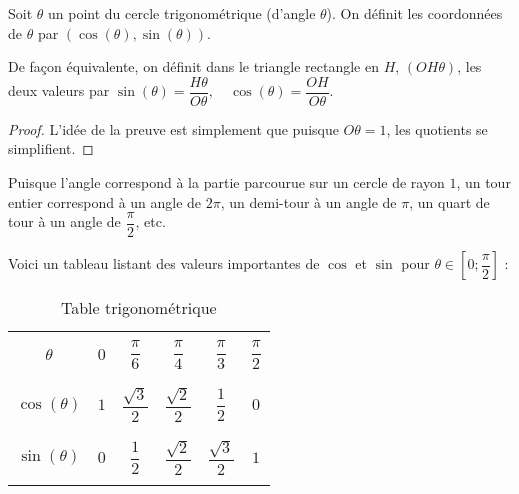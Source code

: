 
\begin{defi}
    Soit $\theta$ un point du cercle trigonométrique (d'angle $\theta$). On définit les coordonnées de $\theta$ par $(\cos(\theta),\sin(\theta))$.
    
    De façon équivalente, on définit dans le triangle rectangle en $H$, $(OH\theta)$, les deux valeurs par $\sin(\theta)=\dfrac{H\theta}{O\theta}, \quad \cos(\theta)=\dfrac{OH}{O\theta}$.
\end{defi}
\begin{proof}
    L'idée de la preuve est simplement que puisque $O\theta=1$, les quotients se simplifient.
\end{proof}
\begin{rmk}
    Puisque l'angle correspond à la partie parcourue sur un cercle de rayon $1$, un tour entier correspond à un angle de $2\pi$, un demi-tour à un angle de $\pi$, un quart de tour à un angle de $\dfrac{\pi}{2}$, etc.
\end{rmk}

Voici un tableau listant des valeurs importantes de $\cos$ et $\sin$ pour $\theta \in \left[0;\dfrac{\pi}{2}\right]$ :

\begin{table}[h]
            \centering
            \begin{tabular}{| c | c  c  c  c  c |}
                \hline
                &&&&&\\
                $\theta$ & $0$ & $\dfrac{\pi}{6}$ & $\dfrac{\pi}{4}$ & $\dfrac{\pi}{3}$ & $\dfrac{\pi}{2}$\\
                &&&&&\\
                \hline
                &&&&&\\
                $\cos(\theta)$ & $1$ & $\dfrac{\sqrt 3}{2}$ & $\dfrac{\sqrt 2}{2}$ & $\dfrac{1}{2}$ & $0$\\
                &&&&&\\
                \hline
                &&&&&\\
                $\sin(\theta)$ & $0$ & $\dfrac{1}{2}$ & $\dfrac{\sqrt 2}{2}$ & $\dfrac{\sqrt 3}{2}$ & $1$\\
                &&&&&\\
                \hline
            \end{tabular}
            \caption{Table trigonométrique}
    \end{table}

